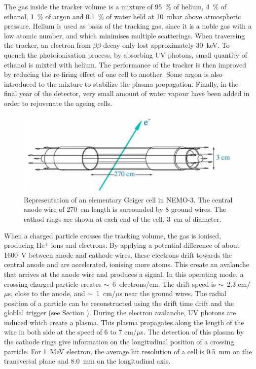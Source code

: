 \documentclass[main.tex]{subfiles}
\begin{document}
\NI The gas inside the tracker volume is a mixture of 95~\% of helium, 4~\% of ethanol, 1~\% of argon and 0.1~\% of water held at 10~mbar above atmospheric pressure. Helium is used as basis of the tracking gas, since it is a noble gas with a low atomic number, and which minimises multiple scatterings. When traversing the tracker, an electron from $\beta\beta$ decay only lost approximately 30~keV. To quench the photoionisation process, by absorbing UV photons, small quantity of ethanol is mixted with helium. The performance of the tracker is then improved by reducing the re-firing effect of one cell to another. Some argon is also introduced to the mixture to stabilize the plasma propagation. Finally, in the final year of the detector, very small amount of water vapour have been added in order to rejuvenate the ageing cells.



\begin{figure}[h!]
\begin{center}
\includegraphics[scale=0.3]{pictures/Chap3/GeigerCellNEMO3.png}
\caption{Representation of an elementary Geiger cell in NEMO-3. The central anode wire of 270~cm length is surrounded by 8 ground wires. The cathod rings are shown at each end of the cell, 3~cm of diameter.}
\label{GeigerCellNEMO3}
\end{center}
\end{figure}


\NI When a charged particle crosses the tracking volume, the gas is ionised, producing He$^{+}$ ions and electrons. By applying a potential difference of about 1600~V between anode and cathode wires, these electrons drift towards the central anode and are accelerated, ionising more atoms. This create an avalanche that arrives at the anode wire and produces a signal. In this operating mode, a crossing charged particle creates $\sim$~6~electrons/cm. The drift speed is $\sim$~2.3 cm/$\mu$s, close to the anode, and $\sim$~1~cm/$\mu$s near the ground wires. The radial position of a particle can be reconstructed using the drift time drift and the globlal trigger (see Section ). During the electron avalanche, UV photons are induced which create a plasma. This plasma propagates along the length of the wire in both side at the speed of 6 to 7 cm/$\mu$s. The detection of this plasma by the cathode rings give information on the longitudinal position of a crossing particle. For 1~MeV electron, the average hit resolution of a cell is 0.5~mm  on  the  transversal plane and 8.0~mm on the longitudinal axis.
\end{document}
